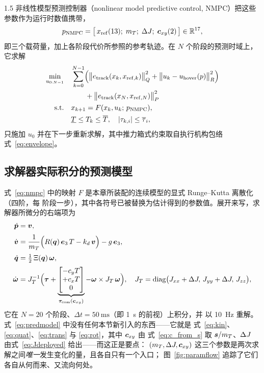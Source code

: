 \begin{spacing}{1.5}
非线性模型预测控制器（nonlinear model predictive control, NMPC）把这些参数作为运行时数值携带，
\begin{equation}
p_{\mathrm{NMPC}} = \bigl[\, x_{\mathrm{ref}}(13);\; m_T;\; \Delta J;\; \bm{c}_{xy}(2) \,\bigr] \in \mathbb{R}^{17},
\label{eq:pnmpc}
\end{equation}
即三个载荷量，加上各阶段代价所参照的参考轨迹。在 $N$ 个阶段的预测时域上，它求解
\begin{align}
\min_{u_{0:N-1}} \quad
& \sum_{k=0}^{N-1} \Bigl( \bigl\| e_{\mathrm{track}}(x_k, x_{\mathrm{ref},k}) \bigr\|^2_{Q}
+ \bigl\| u_k - u_{\mathrm{hover}}(p) \bigr\|^2_{R} \Bigr) \nonumber \\
& \qquad + \bigl\| e_{\mathrm{track}}(x_N, x_{\mathrm{ref},N}) \bigr\|^2_{P} \nonumber \\
\mathrm{s.t.} \quad
& x_{k+1} = F(x_k, u_k;\, p_{\mathrm{NMPC}}), \nonumber \\
& \underline{T} \le T_k \le \overline{T}, \quad
  |\tau_{k,i}| \le \overline{\tau}_i ,
\label{eq:nmpc}
\end{align}
只施加 $u_0$ 并在下一步重新求解，其中推力箱式约束取自执行机构包络式~\eqref{eq:envelope}。

\subsection{求解器实际积分的预测模型}\label{sec:model:predmodel}

式~\eqref{eq:nmpc} 中的映射 $F$ 是本章所装配的连续模型的显式 Runge--Kutta 离散化（四阶，每
阶段一步），其中各符号已被替换为估计得到的参数值。展开来写，求解器所微分的右端项为
\begin{align}
\dot{\bm p} &= \bm v, \nonumber\\[2pt]
\dot{\bm v} &= \frac{1}{m_T}\Bigl(R(\bm q)\,\bm{e}_3\,T - k_d\,\bm v\Bigr) - g\,\bm{e}_3,
\nonumber\\[2pt]
\dot{\bm q} &= \tfrac{1}{2}\,\Xi(\bm q)\,\bm\omega, \nonumber\\[2pt]
\dot{\bm\omega} &= J_T^{-1}\Bigl(
  \bm\tau
  + \underbrace{\begin{bmatrix} -c_y T \\ +c_x T \\ 0\end{bmatrix}}_{\bm{\tau}_{\mathrm{com}}(\bm{c}_{xy})}
  - \bm\omega \times J_T\,\bm\omega \Bigr),
\quad
J_T = \mathrm{diag}\bigl(J_{xx}+\Delta J,\, J_{yy}+\Delta J,\, J_{zz}\bigr),
\label{eq:predmodel}
\end{align}
它在 $N=20$ 个阶段、$\Delta t = \SI{50}{\milli\second}$（即 \SI{1}{\second} 的前视）上积分，并
以 \SI{10}{\hertz} 重解。式~\eqref{eq:predmodel} 中没有任何本节新引入的东西——它就是
式~\eqref{eq:kin}、\eqref{eq:quat}、\eqref{eq:trans} 与 \eqref{eq:rot}，其中 $\bm{c}_{xy}$ 由
式~\eqref{eq:c_from_s} 取 $\bm{s}/m_T$、$\Delta J$ 由式~\eqref{eq:Jdeployed} 给出——而这正是要点：
$(m_T, \Delta J, \bm{c}_{xy})$ 这三个参数是两次求解之间\emph{唯一}发生变化的量，且各自只有一个入口；
图~\ref{fig:paramflow} 追踪了它们各自从何而来、又流向何处。


\end{spacing}
